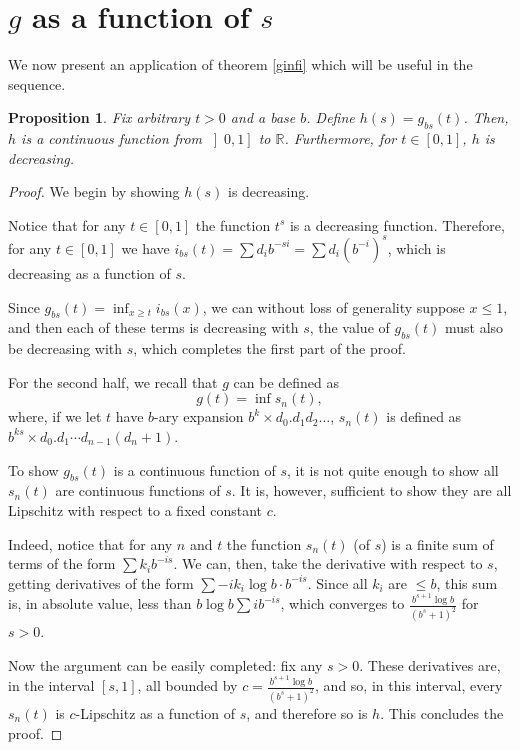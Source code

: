 \documentclass[11pt, reqno]{amsart}
\newcommand{\R}{\mathbb{R}}
\newtheorem{prop}{Proposition}
\begin{document}
\section{$g$ as a function of $s$}

We now present an application of theorem \ref{ginfi} which will be useful in the sequence.

\begin{prop} \label{gfuncofs}
Fix arbitrary $t > 0$ and a base $b$. Define $h(s) = g_{bs}(t)$. Then, $h$ is a continuous function from $\left]0, 1 \right]$ to $\R$. Furthermore, for $t \in \left[0, 1 \right]$, $h$ is decreasing.
\end{prop}

\begin{proof}
We begin by showing $h(s)$ is decreasing.

Notice that for any $t \in \left[0, 1 \right]$ the function $t^s$ is a decreasing function. Therefore, for any $t \in \left[0, 1\right]$ we have $i_{bs}(t) = \sum d_i b^{-si} = \sum d_i (b^{-i})^s$, which is decreasing as a function of $s$.

Since $g_{bs}(t) = \inf_{x \geq t} i_{bs}(x)$, we can without loss of generality suppose $x \leq 1$, and then each of these terms is decreasing with $s$, the value of $g_{bs}(t)$ must also be decreasing with $s$, which completes the first part of the proof.

For the second half, we recall that $g$ can be defined as
\[g(t) = \inf s_n(t),\]
where, if we let $t$ have $b$-ary expansion $b^k \times d_0 . d_1 d_2 \dots$, $s_n(t)$ is defined as $b^{ks} \times d_0 . d_1 \cdots d_{n-1} (d_n + 1)$.

To show $g_{bs}(t)$ is a continuous function of $s$, it is not quite enough to show all $s_n(t)$ are continuous functions of $s$. It is, however, sufficient to show they are all Lipschitz with respect to a fixed constant $c$.

Indeed, notice that for any $n$ and $t$ the function $s_n(t)$ (of $s$) is a finite sum of terms of the form $\sum k_i b^{-is}$.  We can, then, take the derivative with respect to $s$, getting derivatives of the form $\sum - i k_i \log b \cdot b^{-is}$. Since all $k_i$ are $\leq b$, this sum is, in absolute value, less than $b \log b \sum i b^{-is}$, which converges to $\frac{b^{s+1} \log b}{(b^s + 1)^2}$ for $s > 0$.

Now the argument can be easily completed: fix any $s > 0$. These derivatives are, in the interval $\left[s, 1 \right]$, all bounded by $c = \frac{b^{s+1} \log b}{(b^s + 1)^2}$, and so, in this interval, every $s_n(t)$ is $c$-Lipschitz as a function of $s$, and therefore so is $h$. This concludes the proof.
\end{proof}
\end{document}
